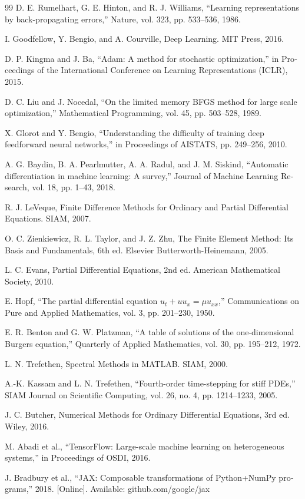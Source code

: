 \begin{singlespace}
\begin{latin}
\begin{thebibliography}{99}
D. E. Rumelhart, G. E. Hinton, and R. J. Williams, “Learning representations
by back-propagating errors,” Nature, vol. 323, pp. 533–536, 1986.

I. Goodfellow, Y. Bengio, and A. Courville, Deep Learning. MIT Press, 2016.

D. P. Kingma and J. Ba, “Adam: A method for stochastic optimization,” in
Proceedings of the International Conference on Learning Representations
(ICLR), 2015.

D. C. Liu and J. Nocedal, “On the limited memory BFGS method for large scale
optimization,” Mathematical Programming, vol. 45, pp. 503–528, 1989.

X. Glorot and Y. Bengio, “Understanding the difficulty of training deep
feedforward neural networks,” in Proceedings of AISTATS, pp. 249–256, 2010.

A. G. Baydin, B. A. Pearlmutter, A. A. Radul, and J. M. Siskind, “Automatic
differentiation in machine learning: A survey,” Journal of Machine Learning
Research, vol. 18, pp. 1–43, 2018.

R. J. LeVeque, Finite Difference Methods for Ordinary and Partial Differential
Equations. SIAM, 2007.

O. C. Zienkiewicz, R. L. Taylor, and J. Z. Zhu, The Finite Element Method: Its
Basis and Fundamentals, 6th ed. Elsevier Butterworth-Heinemann, 2005.

L. C. Evans, Partial Differential Equations, 2nd ed. American Mathematical
Society, 2010.

E. Hopf, “The partial differential equation $u_t+uu_x=\mu u_{xx}$,”
Communications on Pure and Applied Mathematics, vol. 3, pp. 201–230, 1950.

E. R. Benton and G. W. Platzman, “A table of solutions of the one-dimensional
Burgers equation,” Quarterly of Applied Mathematics, vol. 30, pp. 195–212,
1972.

L. N. Trefethen, Spectral Methods in MATLAB. SIAM, 2000.

A.-K. Kassam and L. N. Trefethen, “Fourth-order time-stepping for stiff PDEs,”
SIAM Journal on Scientific Computing, vol. 26, no. 4, pp. 1214–1233, 2005.

J. C. Butcher, Numerical Methods for Ordinary Differential Equations, 3rd ed.
Wiley, 2016.

M. Abadi et al., “TensorFlow: Large-scale machine learning on heterogeneous
systems,” in Proceedings of OSDI, 2016.

J. Bradbury et al., “JAX: Composable transformations of Python+NumPy
programs,” 2018. [Online]. Available: github.com/google/jax

\end{thebibliography}
\end{latin}
\end{singlespace}
